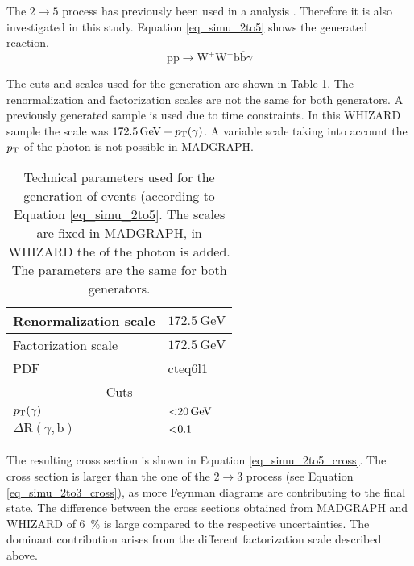The $2 \to 5$ process has previously been used in a \ttgamma analysis \cite{CMS-PAS-TOP-13-011}. Therefore it is also investigated in this study. Equation \ref{eq_simu_2to5} shows the generated reaction. \\

\begin{equation}
\mathrm{pp} \to \mathrm{W}^+ \mathrm{W}^- \mathrm{b} \overline{\mathrm{b}} \gamma
\label{eq_simu_2to5}
\end{equation}

The cuts and scales used for the generation are shown in Table \ref{tab_simu_2to5}. The renormalization and factorization scales are not the same for both generators. A previously generated sample is used due to time constraints. In this WHIZARD sample the scale was $\SI{172.5}{\giga \electronvolt} + p_{\mathrm{T}}(\gamma)$. A variable scale taking into account the $p_{\mathrm{T}}$ of the photon is not possible in MADGRAPH.\\

\begin{table}[ht]
\centering
    \caption{Technical parameters used for the generation of \ttgamma events (according to\\ Equation \ref{eq_simu_2to5}. The scales are fixed in MADGRAPH, in WHIZARD the \pt of the photon is added. The parameters are the same for both generators.}
    \begin{tabular}{| l | l |}

    \hline
    Renormalization scale & $ \SI{172.5}{\giga \electronvolt} $ \\
    \hline
    Factorization scale & $ \SI{172.5}{\giga \electronvolt} $ \\
    \hline
    PDF & cteq6l1 \\
    \hline
    \multicolumn{2}{|c|}{Cuts} \\
    \hline
    $p_{\mathrm{T}}(\gamma)$ & $\SI{<20}{\giga \electronvolt}$ \\
    \hline
    $\Delta \mathrm{R}(\gamma,\mathrm{b})$ & $\num{<0.1}$ \\
    \hline
    \end{tabular}
     \label{tab_simu_2to5}
\end{table}

The resulting cross section is shown in Equation \ref{eq_simu_2to5_cross}. The cross section is larger than the one of the $2 \to 3$ process (see Equation \ref{eq_simu_2to3_cross}), as more Feynman diagrams are contributing to the final state. The difference between the cross sections obtained from MADGRAPH and WHIZARD of \SI{6}{\percent} is large compared to the respective uncertainties. The dominant contribution arises from the different factorization scale described above.\\

